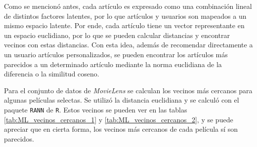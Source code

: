 Como se mencionó antes, cada artículo es expresado como una combinación lineal de distintos factores latentes, por lo que artículos y usuarios son mapeados a un mismo espacio latente. Por ende, cada artículo tiene un vector representante en un espacio euclidiano, por lo que se pueden calcular distancias y encontrar vecinos con estas distancias. Con esta idea, además de recomendar directamente a un usuario artículos personalizados, se pueden encontrar los artículos más parecidos a un determinado artículo mediante la norma euclidiana de la diferencia o la similitud coseno. 

Para el conjunto de datos de \textit{MovieLens} se calculan los vecinos más cercanos para algunas películas selectas. Se utilizó la distancia euclidiana y se calculó con el paquete \texttt{RANN} \cite{RANN_package} de \texttt{R}. Estos vecinos se pueden ver en las tablas \ref{tab:ML_vecinos_cercanos_1} y \ref{tab:ML_vecinos_cercanos_2}, y se puede apreciar que en cierta forma, los vecinos más cercanos de cada película sí son parecidos.

